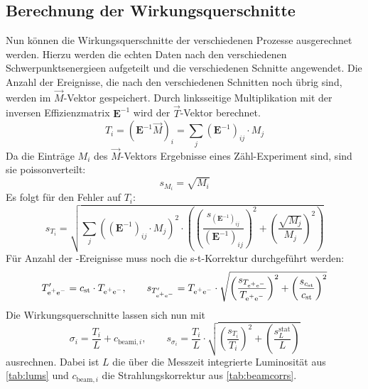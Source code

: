 \subsection{Berechnung der Wirkungsquerschnitte}
Nun können die Wirkungsquerschnitte der verschiedenen Prozesse ausgerechnet werden. Hierzu werden die echten Daten nach den verschiedenen
Schwerpunktsenergieen aufgeteilt und die verschiedenen Schnitte angewendet. Die Anzahl der Ereignisse, die nach den verschiedenen Schnitten
noch übrig sind, werden im $\vec{M}$-Vektor gespeichert. Durch linksseitige Multiplikation mit der inversen Effizienzmatrix $\bm{E}^{-1}$
wird der $\vec{T}$-Vektor berechnet.
\begin{equation}
    T_i = \left( \bm{E}^{-1} \vec{M} \right)_i = \sum_j (\bm{E}^{-1})_{ij} \cdot M_j
\end{equation}
Da die Einträge $M_i$ des $\vec{M}$-Vektors Ergebnisse eines Zähl-Experiment sind, sind sie poissonverteilt:
\begin{equation}
    s_{M_i} = \sqrt{M_i}
\end{equation}
Es folgt für den Fehler auf $T_i$:
\begin{equation}
    s_{T_i} = \sqrt{\sum_j \left( (\bm{E}^{-1})_{ij} \cdot M_j \right)^2 \cdot
    \left( \left( \frac{s_{(\bm{E}^{-1})_{ij}}}{(\bm{E}^{-1})_{ij}} \right)^2 + \left( \frac{\sqrt{M_j}}{M_j} \right)^2 \right) }
\end{equation}
Für Anzahl der \ee -Ereignisse muss noch die s-t-Korrektur durchgeführt werden:
\begin{equation}
    T_\text{e$^+$e$^-$}' = c_\text{st} \cdot T_\text{e$^+$e$^-$}, \qquad
    s_{T_\text{e$^+$e$^-$}'} = T_\text{e$^+$e$^-$} \cdot \sqrt{ \left( \frac{s_{T_\text{e$^+$e$^-$}}}{T_\text{e$^+$e$^-$}} \right)^2 + \left( \frac{s_{c_\text{st}}}{c_\text{st}} \right)^2 }
\end{equation}
Die Wirkungsquerschnitte lassen sich nun mit
\begin{equation}
    \sigma_i = \frac{T_i}{L} + c_{\text{beami}, i}, \qquad
    s_{\sigma_i} = \frac{T_i}{L} \cdot \sqrt{ \left( \frac{s_{T_i}}{T_i} \right)^2 + \left( \frac{s_L^\text{stat}}{L} \right) }
\end{equation}
ausrechnen. Dabei ist $L$ die über die Messzeit integrierte Luminosität aus \autoref{tab:lums}
und $c_{\text{beam}, i}$ die Strahlungskorrektur aus \autoref{tab:beamcorrs}.

